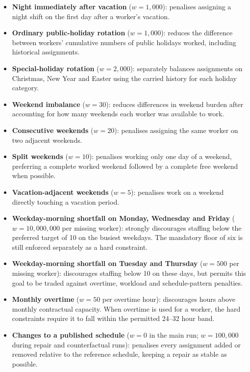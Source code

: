\documentclass[11pt,a4paper]{article}
\begin{document}
\begin{itemize}
  \item \textbf{Night immediately after vacation} ($w=1{,}000$): penalises assigning a night shift on the first day after a worker's vacation.

  \item \textbf{Ordinary public-holiday rotation} ($w=1{,}000$): reduces the difference between workers' cumulative numbers of public holidays worked, including historical assignments.

  \item \textbf{Special-holiday rotation} ($w=2{,}000$): separately balances assignments on Christmas, New Year and Easter using the carried history for each holiday category.

  \item \textbf{Weekend imbalance} ($w=30$): reduces differences in weekend burden after accounting for how many weekends each worker was available to work.

  \item \textbf{Consecutive weekends} ($w=20$): penalises assigning the same worker on two adjacent weekends.

  \item \textbf{Split weekends} ($w=10$): penalises working only one day of a weekend, preferring a complete worked weekend followed by a complete free weekend when possible.

  \item \textbf{Vacation-adjacent weekends} ($w=5$): penalises work on a weekend directly touching a vacation period.

  \item \textbf{Weekday-morning shortfall on Monday, Wednesday and Friday} ($w=10{,}000{,}000$ per missing worker): strongly discourages staffing below the preferred target of 10 on the busiest weekdays. The mandatory floor of six is still enforced separately as a hard constraint.

  \item \textbf{Weekday-morning shortfall on Tuesday and Thursday} ($w=500$ per missing worker): discourages staffing below 10 on these days, but permits this goal to be traded against overtime, workload and schedule-pattern penalties.

  \item \textbf{Monthly overtime} ($w=50$ per overtime hour): discourages hours above monthly contractual capacity. When overtime is used for a worker, the hard constraints require it to fall within the permitted 24--32 hour band.

  \item \textbf{Changes to a published schedule} ($w=0$ in the main run; $w=100{,}000$ during repair and counterfactual runs): penalises every assignment added or removed relative to the reference schedule, keeping a repair as stable as possible.
\end{itemize}
\end{document}
